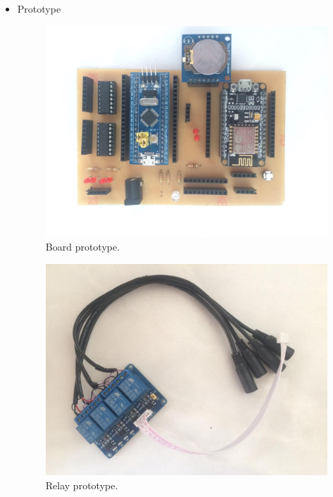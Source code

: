 \documentclass[a4paper,12pt,oneside]{article}
\begin{document}
\begin{itemize}
\item Prototype
	\begin{figure}[H]
	\begin{center}
	\includegraphics[scale=.15]{hinh/prototype_board.jpg}
	\end{center}
	\caption{Board prototype.}
	\end{figure}
	
	\begin{figure}[H]
	\begin{center}
	\includegraphics[scale=.4]{hinh/relay_prototype.jpg}
	\end{center}
	\caption{Relay prototype.}
	\end{figure}
	

\end{itemize}
\end{document}
